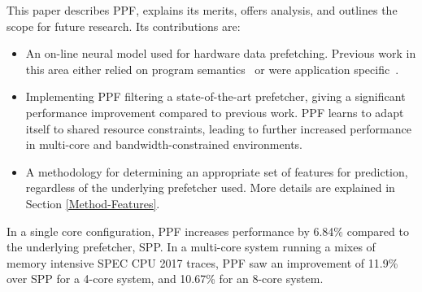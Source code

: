 
This paper describes PPF, explains its merits, offers analysis, and
outlines the scope for future research. Its contributions are:

\begin{itemize}

\item An on-line neural model used for hardware data prefetching.
  Previous work in this area either relied on program
  semantics~\cite{Semantics} or were application
  specific~\cite{Datacenter}.

\item Implementing PPF filtering a state-of-the-art prefetcher, giving
  a significant performance improvement compared to previous work. PPF
  learns to adapt itself to shared resource constraints, leading to
  further increased performance in multi-core and
  bandwidth-constrained environments.

\item A methodology for determining an appropriate set of features for
  prediction, regardless of the underlying prefetcher used.  More
  details are explained in Section \ref{Method-Features}.

\end{itemize}

In a single core configuration, PPF increases performance by 6.84\%
compared to the underlying prefetcher, SPP. In a multi-core system
running a mixes of memory intensive SPEC CPU 2017 traces, PPF saw an
improvement of 11.9\% over SPP for a 4-core system, and 10.67\% for an
8-core system.  

